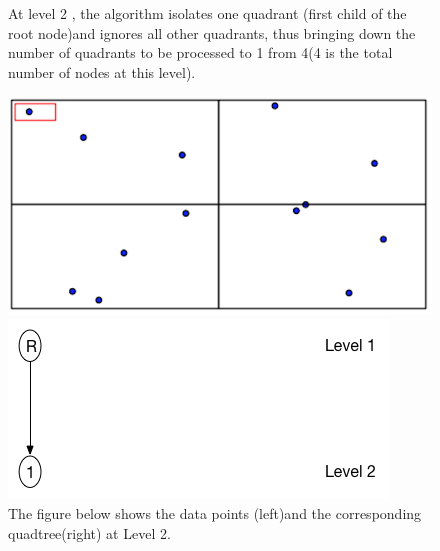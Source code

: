 \documentclass{article}
\begin{document}
\begin{figure}[ht]
At level 2 , the algorithm isolates  one quadrant (first child of the root node)and ignores all other quadrants, thus bringing down the number of quadrants to be processed to 1 from 4(4 is the total number of nodes at this level).
\caption{The figure below shows the data points (left)and the corresponding quadtree(right) at Level 2.}
  \centering
  \begin{minipage}[b]{0.35\textwidth}
    \includegraphics[width=\textwidth]{1_1Quad1_2}  
  \end{minipage}
  \hfill
  \begin{minipage}[b]{0.5\textwidth}
    \includegraphics[width=\textwidth]{1Quad_2_tree}
  \end{minipage}
\end{figure}
\end{document}
